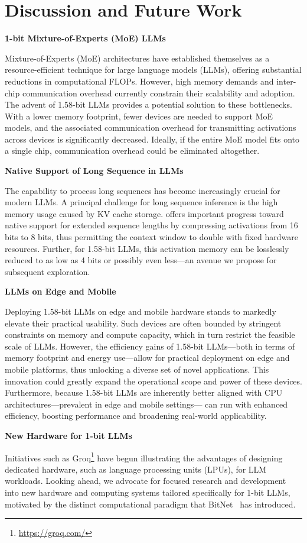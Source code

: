 \section{Discussion and Future Work}

\textbf{1-bit Mixture-of-Experts (MoE) LLMs}

Mixture-of-Experts (MoE) architectures have established themselves as a resource-efficient technique for large language models (LLMs), offering substantial reductions in computational FLOPs. However, high memory demands and inter-chip communication overhead currently constrain their scalability and adoption. The advent of 1.58-bit LLMs provides a potential solution to these bottlenecks. With a lower memory footprint, fewer devices are needed to support MoE models, and the associated communication overhead for transmitting activations across devices is significantly decreased. Ideally, if the entire MoE model fits onto a single chip, communication overhead could be eliminated altogether.

\textbf{Native Support of Long Sequence in LLMs}

The capability to process long sequences has become increasingly crucial for modern LLMs. A principal challenge for long sequence inference is the high memory usage caused by KV cache storage.  offers important progress toward native support for extended sequence lengths by compressing activations from 16 bits to 8 bits, thus permitting the context window to double with fixed hardware resources. Further, for 1.58-bit LLMs, this activation memory can be losslessly reduced to as low as 4 bits or possibly even less—an avenue we propose for subsequent exploration.

\textbf{LLMs on Edge and Mobile}

Deploying 1.58-bit LLMs on edge and mobile hardware stands to markedly elevate their practical usability. Such devices are often bounded by stringent constraints on memory and compute capacity, which in turn restrict the feasible scale of LLMs. However, the efficiency gains of 1.58-bit LLMs—both in terms of memory footprint and energy use—allow for practical deployment on edge and mobile platforms, thus unlocking a diverse set of novel applications. This innovation could greatly expand the operational scope and power of these devices. Furthermore, because 1.58-bit LLMs are inherently better aligned with CPU architectures—prevalent in edge and mobile settings— can run with enhanced efficiency, boosting performance and broadening real-world applicability.

\textbf{New Hardware for 1-bit LLMs}

Initiatives such as Groq\footnote{\url{https://groq.com/}} have begun illustrating the advantages of designing dedicated hardware, such as language processing units (LPUs), for LLM workloads. Looking ahead, we advocate for focused research and development into new hardware and computing systems tailored specifically for 1-bit LLMs, motivated by the distinct computational paradigm that BitNet~\cite{bitnet} has introduced.


